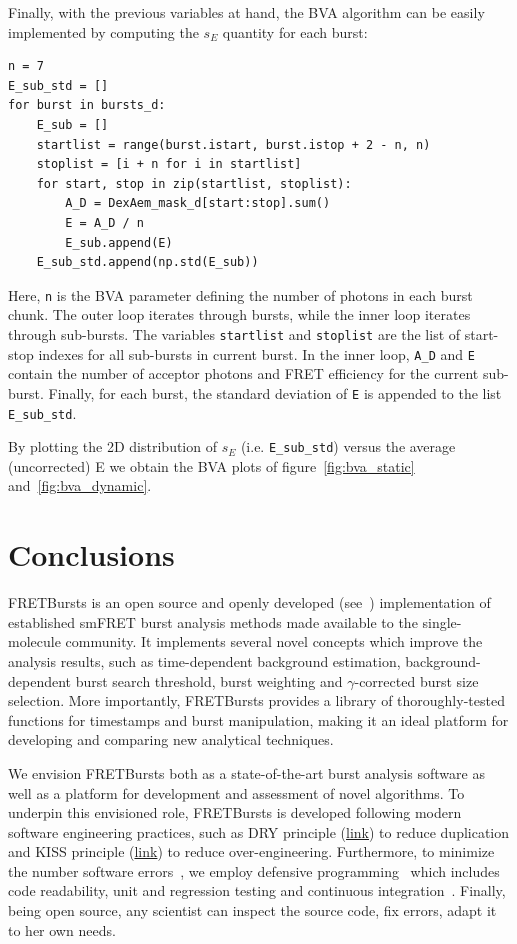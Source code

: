 \documentclass[10pt,letterpaper]{article}
\begin{document}
Finally, with the previous variables at hand, the BVA algorithm
can be easily implemented by computing the $s_E$ quantity for each burst:

\begin{lstlisting}
n = 7
E_sub_std = []
for burst in bursts_d:
    E_sub = []
    startlist = range(burst.istart, burst.istop + 2 - n, n)
    stoplist = [i + n for i in startlist]
    for start, stop in zip(startlist, stoplist):
        A_D = DexAem_mask_d[start:stop].sum()
        E = A_D / n
        E_sub.append(E)
    E_sub_std.append(np.std(E_sub))
\end{lstlisting}

Here, \verb|n| is the BVA parameter defining the number of photons in each burst chunk.
The outer loop iterates through bursts, while the inner loop iterates through sub-bursts.
The variables \verb|startlist| and \verb|stoplist| are the list of start-stop indexes for
all sub-bursts in current burst.
In the inner loop, \verb|A_D| and \verb|E| contain the number of acceptor photons and
FRET efficiency for the current sub-burst. Finally, for each burst, the standard deviation
of \verb|E| is appended to the list \verb|E_sub_std|.

By plotting the 2D distribution of $s_E$ (i.e. \verb|E_sub_std|) versus the average (uncorrected) E
we obtain the BVA plots of figure~\ref{fig:bva_static} and~\ref{fig:bva_dynamic}.



\section*{Conclusions}
\label{sec:conclusions}

FRETBursts is an open source and openly developed (see~) implementation %
of established smFRET burst analysis methods
made available to the single-molecule community.
It implements several novel concepts which improve the analysis results, such as
time-dependent background estimation, background-dependent burst search threshold,
burst weighting and $\gamma$-corrected burst size selection.
More importantly, FRETBursts provides a library of thoroughly-tested functions
for timestamps and burst manipulation, making it an ideal platform for
developing and comparing new analytical techniques.

We envision FRETBursts both as a state-of-the-art burst analysis
software as well as a platform for development and assessment of novel algorithms.
To underpin this envisioned role, FRETBursts is developed following modern
software engineering practices, such as DRY principle
(\href{http://en.wikipedia.org/wiki/Don\%27t_repeat_yourself}{link})
to reduce duplication and KISS principle
(\href{http://en.wikipedia.org/wiki/KISS_principle}{link})
to reduce over-engineering. Furthermore, to minimize the number software errors~\cite{Merali_2010,Soergel_2015},
we employ defensive programming~\cite{Prli__2012} which includes code readability,
unit and regression testing and continuous integration~\cite{Eglen_2016}.
Finally, being open source, any scientist can inspect the source code,
fix errors, adapt it to her own needs.
\end{document}
